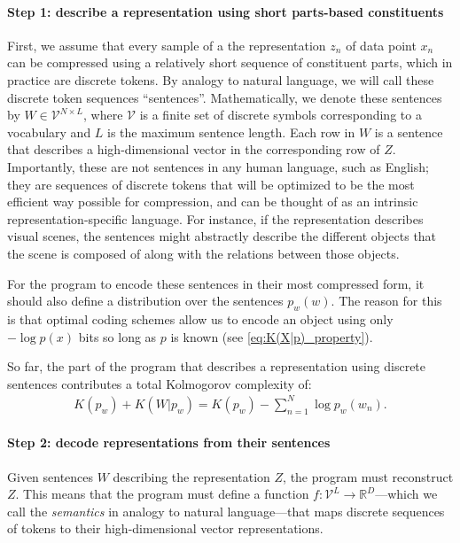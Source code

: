 \documentclass{article}
\begin{document}
\paragraph{Step 1: describe a representation using short parts-based constituents}

First, we assume that every sample of a the representation $z_n$ of data point $x_n$ can be compressed using a relatively short sequence of constituent parts, which in practice are discrete tokens. By analogy to natural language, we will call these discrete token sequences ``sentences''. Mathematically, we denote these sentences by $W \in \mathcal{V}^{N \times L}$, where $\mathcal{V}$ is a finite set of discrete symbols corresponding to a vocabulary and $L$ is the maximum sentence length. Each row in $W$ is a sentence that describes a high-dimensional vector in the corresponding row of $Z$. Importantly, these are not sentences in any human language, such as English; they are sequences of discrete tokens that will be optimized to be
the most efficient way possible for compression, and can be thought of as an intrinsic representation-specific language. For instance, if the representation describes visual scenes, the sentences might abstractly describe the different objects that the scene is composed of along with the relations between those objects.

For the program to encode these sentences in their most compressed form, it should also define a distribution over the sentences $p_w(w)$. The reason for this is that optimal coding schemes \citep[e.g., arithmetic coding][]{witten1987arithmetic} allow us to encode an object using only $-\log p(x)$ bits so long as $p$ is known (see \cref{eq:K(X|p)_property}).

So far, the part of the program that describes a representation using discrete sentences contributes a total Kolmogorov complexity of:
\begin{align*}
     K(p_w) + K(W|p_w) = K(p_w) - \sum_{n=1}^N \log p_w(w_n) .
\end{align*}

\paragraph{Step 2: decode representations from their sentences}

Given sentences $W$ describing the representation $Z$, the program must reconstruct $Z$. This means that the program must define a function $f: \mathcal{V}^L \rightarrow \mathbb{R}^D$---which we call the \textit{semantics} in analogy to natural language---that maps discrete sequences of tokens to their high-dimensional vector representations.
\end{document}
